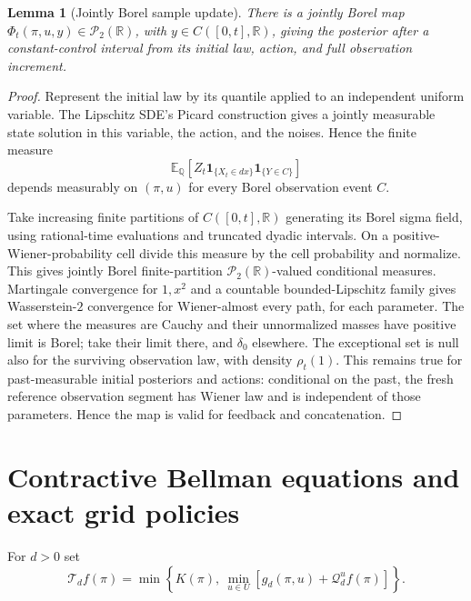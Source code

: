 \documentclass[11pt,a4paper]{article}
\newtheorem{lemma}[theorem]{Lemma}
\theoremstyle{definition}
\theoremstyle{remark}
\newcommand{\R}{\mathbb R}
\newcommand{\E}{\mathbb E}
\newcommand{\Qq}{\mathbb Q}
\newcommand{\Ptwo}{\mathcal P_2(\R)}
\newcommand{\cQ}{\mathcal Q}
\newcommand{\cT}{\mathcal T}
\newcommand{\ind}{\mathbf 1}
\begin{document}
\begin{lemma}[Jointly Borel sample update]\label{lem:update}
There is a jointly Borel map
\(\Phi_t(\pi,u,y)\in\Ptwo\), with
\(y\in C([0,t],\R)\), giving the posterior after a constant-control
interval from its initial law, action, and full observation increment.
\end{lemma}
\begin{proof}
Represent the initial law by its quantile applied to an independent
uniform variable. The Lipschitz SDE's Picard construction gives a
jointly measurable state solution in this variable, the action, and
the noises. Hence the finite measure
\[
 \E_\Qq[Z_t\ind_{\{X_t\in dx\}}\ind_{\{Y\in C\}}]
\]
depends measurably on \((\pi,u)\) for every Borel observation event \(C\).

Take increasing finite partitions of \(C([0,t],\R)\) generating its
Borel sigma field, using rational-time evaluations and truncated
dyadic intervals. On a positive-Wiener-probability cell divide this
measure by the cell probability and normalize. This gives jointly
Borel finite-partition \(\Ptwo\)-valued conditional measures.
Martingale convergence for \(1,x^2\) and a countable bounded-Lipschitz
family gives Wasserstein-\(2\) convergence for Wiener-almost every
path, for each parameter. The set where the measures are Cauchy and
their unnormalized masses have positive limit is Borel; take their
limit there, and \(\delta_0\) elsewhere. The exceptional set is null
also for the surviving observation law, with density \(\rho_t(1)\).
This remains true for past-measurable initial posteriors and actions:
conditional on the past, the fresh reference observation segment has
Wiener law and is independent of those parameters. Hence the map is
valid for feedback and concatenation.
\end{proof}

\section{Contractive Bellman equations and exact grid policies}

For \(d>0\) set
\begin{equation}\label{eq:T}
 \cT_df(\pi)=\min\left\{K(\pi),\
       \min_{u\in U}[g_d(\pi,u)+\cQ_d^u f(\pi)]\right\}.
\end{equation}
\end{document}
